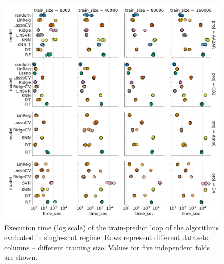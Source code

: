 \begin{figure}[ht]
\centering
\includegraphics[width=1.0\textwidth]{figures/Supp_Figure_1_execution_time.png}
\caption{Execution time (log scale) of the train-predict loop of the algorithms evaluated in single-shot regime. Rows represent different datasets, columns -- different training size. Values for five independent folds are shown.}
\label{fig:supp_fig_1_execution_time}
\end{figure}
